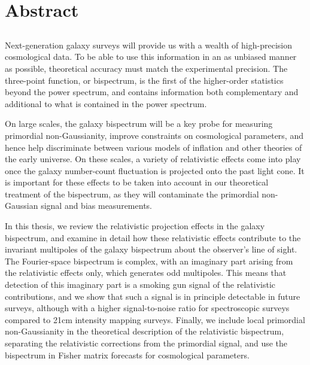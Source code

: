\chapter*{Abstract}
\label{ch:abstract}
\section*{}
\singlespacing


Next-generation galaxy surveys will provide us with a wealth of high-precision cosmological data. To be able to use this information in an as unbiased manner as possible, theoretical accuracy must match the experimental precision. The three-point function, or bispectrum, is the first of the higher-order statistics beyond the power spectrum, and contains information both complementary and additional to what is contained in the power spectrum.

On large scales, the galaxy bispectrum will be a key probe for measuring primordial non-Gaussianity, improve constraints on cosmological parameters, and hence help discriminate between various models of inflation and other theories of the early universe. On these scales, a variety of relativistic effects come into play once the galaxy number-count fluctuation is projected onto the past light cone. It is important for these effects to be taken into account in our theoretical treatment of the bispectrum, as they will contaminate the primordial non-Gaussian signal and bias measurements. 

In this thesis, we review the relativistic projection effects in the galaxy bispectrum, and examine in detail how these relativistic effects contribute to the invariant multipoles of the galaxy bispectrum about the observer's line of sight. The Fourier-space bispectrum is complex, with an imaginary part arising from the relativistic effects only, which generates odd multipoles. This means that detection of this imaginary part is a smoking gun signal of the relativistic contributions, and we show that such a signal is in principle detectable in future surveys, although with a higher signal-to-noise ratio for spectroscopic surveys compared to 21cm intensity mapping surveys. Finally, we include local primordial non-Gaussianity in the theoretical description of the relativistic bispectrum, separating the relativistic corrections from the primordial signal, and use the bispectrum in Fisher matrix forecasts for cosmological parameters.